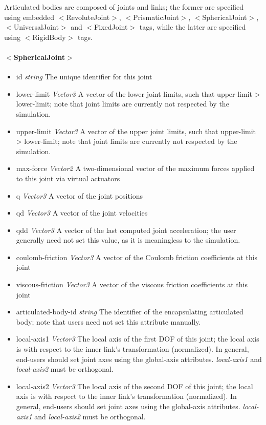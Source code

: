 \documentclass{article}
\begin{document}
\begin{landscape}
\begin{itemize}
Articulated bodies are composed of joints and links; the former are specified using embedded $<$RevoluteJoint$>$, $<$PrismaticJoint$>$, $<$SphericalJoint$>$, $<$UniversalJoint$>$ and $<$FixedJoint$>$ tags, while the latter are specified using $<$RigidBody$>$ tags.

\paragraph{$<$SphericalJoint$>$}
\begin{itemize}
 \item id  \emph{string}  The unique identifier for this joint
 \item lower-limit  \emph{Vector3}  A vector of the lower joint limits, such that upper-limit > lower-limit; note that joint limits are currently not respected by the simulation. 
 \item upper-limit  \emph{Vector3}  A vector of the upper joint limits, such that upper-limit > lower-limit; note that joint limits are currently not respected by the simulation.
 \item max-force  \emph{Vector2}  A two-dimensional vector of the maximum forces applied to this joint via virtual actuators 
 \item q  \emph{Vector3}  A vector of the joint positions 
 \item qd  \emph{Vector3}  A vector of the joint velocities
 \item qdd  \emph{Vector3}  A vector of the last computed joint acceleration; the user generally need not set this value, as it is meaningless to the simulation.
 \item coulomb-friction  \emph{Vector3}  A vector of the Coulomb friction coefficients at this joint
 \item viscous-friction  \emph{Vector3}  A vector of the viscous friction coefficients at this joint
 \item articulated-body-id  \emph{string} The identifier of the encapsulating articulated body; note that users need not set this attribute manually.
\item local-axis1  \emph{Vector3} The local axis of the first DOF of this joint; the local axis is with respect to the inner link's transformation (normalized).  In general, end-users should set joint axes using the global-axis attributes.  \emph{local-axis1} and \emph{local-axis2} must be orthogonal.
\item local-axis2  \emph{Vector3} The local axis of the second DOF of this joint; the local axis is with respect to the inner link's transformation (normalized).  In general, end-users should set joint axes using the global-axis attributes.  \emph{local-axis1} and \emph{local-axis2} must be orthogonal.

\end{itemize}
\end{itemize}
\end{landscape}
\end{document}
